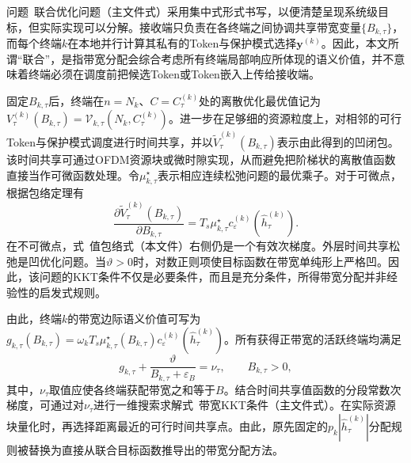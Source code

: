 \documentclass[journal]{IEEEtran}
\begin{document}
问题~联合优化问题（主文件式）采用集中式形式书写，以便清楚呈现系统级目标，但实际实现可以分解。接收端只负责在各终端之间协调共享带宽变量$\{B_{k,\tau}\}$，而每个终端$k$在本地并行计算其私有的Token与保护模式选择$\bm y^{(k)}$。因此，本文所谓“联合”，是指带宽分配会综合考虑所有终端局部响应所体现的语义价值，并不意味着终端必须在调度前把候选Token或Token嵌入上传给接收端。

固定$B_{k,\tau}$后，终端在$n=N_k$、$C=C_{\tau}^{(k)}$处的离散优化最优值记为$V_{\tau}^{(k)}(B_{k,\tau})=\mathcal V_{k,\tau}(N_k,C_{\tau}^{(k)})$。进一步在足够细的资源粒度上，对相邻的可行Token与保护模式调度进行时间共享，并以$\widetilde V_{\tau}^{(k)}(B_{k,\tau})$表示由此得到的凹闭包。该时间共享可通过OFDM资源块或微时隙实现，从而避免把阶梯状的离散值函数直接当作可微函数处理。令$\mu_{k,\tau}^{\star}$表示相应连续松弛问题的最优乘子。对于可微点，根据包络定理有
\begin{equation}
\frac{\partial \widetilde V_{\tau}^{(k)}(B_{k,\tau})}{\partial B_{k,\tau}}
=T_s\mu_{k,\tau}^{\star}
c_{\varepsilon}^{(k)}(\widehat h_{\tau}^{(k)}).
\label{eq:value_envelope}
\end{equation}
在不可微点，式~值包络式（本文件）右侧仍是一个有效次梯度。外层时间共享松弛是凹优化问题。当$\vartheta>0$时，对数正则项使目标函数在带宽单纯形上严格凹。因此，该问题的KKT条件不仅是必要条件，而且是充分条件，所得带宽分配并非经验性的启发式规则。

由此，终端$k$的带宽边际语义价值可写为$g_{k,\tau}(B_{k,\tau})=\omega_kT_s\mu_{k,\tau}^{\star}(B_{k,\tau})c_{\varepsilon}^{(k)}(\widehat h_{\tau}^{(k)})$。所有获得正带宽的活跃终端均满足
\begin{equation}
g_{k,\tau}+
\frac{\vartheta}{B_{k,\tau}+\varepsilon_B}
=\nu_{\tau},
\qquad B_{k,\tau}>0,
\label{eq:bandwidth_kkt}
\end{equation}
其中，$\nu_{\tau}$取值应使各终端获配带宽之和等于$B$。结合时间共享值函数的分段常数次梯度，可通过对$\nu_{\tau}$进行一维搜索求解式~带宽KKT条件（主文件式）。在实际资源块量化时，再选择距离最近的可行时间共享点。由此，原先固定的$p_k|\widehat h_{\tau}^{(k)}|$分配规则被替换为直接从联合目标函数推导出的带宽分配方法。
\end{document}
